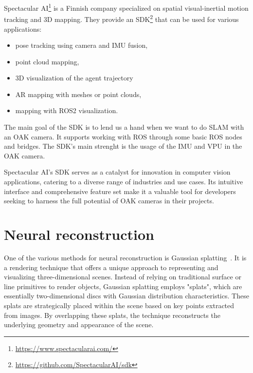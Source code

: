 Spectacular AI\footnote{\url{https://www.spectacularai.com/}} is a Finnish company specialized on spatial visual-inertial motion tracking and 3D mapping. They provide an SDK\footnote{\url{https://github.com/SpectacularAI/sdk}} that can be used for various applications:
\FloatBarrier
\begin{itemize}
\setlength\itemsep{0em}
    \item pose tracking using camera and IMU fusion,
    \item point cloud mapping,
    \item 3D visualization of the agent trajectory
    \item AR mapping with meshes or point clouds,
    \item mapping with ROS2 visualization.
\end{itemize}
\FloatBarrier
The main goal of the SDK is to lend us a hand when we want to do SLAM with an OAK camera. It supports working with ROS through some basic ROS nodes and bridges. The SDK's main strenght is the usage of the IMU and VPU in the OAK camera.

Spectacular AI's SDK serves as a catalyst for innovation in computer vision applications, catering to a diverse range of industries and use cases. Its intuitive interface and comprehensive feature set make it a valuable tool for developers seeking to harness the full potential of OAK cameras in their projects.

\section{Neural reconstruction}

One of the various methods for neural reconstruction is Gaussian splatting~\cite{3DGS}. It is a rendering technique that offers a unique approach to representing and visualizing three-dimensional scenes. Instead of relying on traditional surface or line primitives to render objects, Gaussian splatting employs "splats", which are essentially two-dimensional discs with Gaussian distribution characteristics. These splats are strategically placed within the scene based on key points extracted from images. By overlapping these splats, the technique reconstructs the underlying geometry and appearance of the scene.

